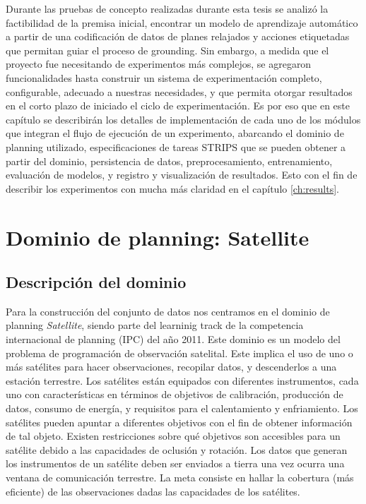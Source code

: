 Durante las pruebas de concepto realizadas durante esta tesis se analizó la factibilidad de la premisa inicial, encontrar un modelo de aprendizaje automático a partir de una codificación de datos de planes relajados y acciones etiquetadas que permitan guiar el proceso de grounding. Sin embargo, a medida que el proyecto fue necesitando de experimentos más complejos, se agregaron funcionalidades hasta construir un sistema de experimentación completo, configurable, adecuado a nuestras necesidades, y que permita otorgar resultados en el corto plazo de iniciado el ciclo de experimentación. Es por eso que en este capítulo se describirán los detalles de implementación de cada uno de los módulos que integran
el flujo de ejecución de un experimento, abarcando el dominio de planning utilizado, especificaciones de tareas STRIPS que se pueden obtener a partir del dominio, persistencia de datos, preprocesamiento, entrenamiento, evaluación de modelos, y registro y visualización de resultados. Esto con el fin de describir los experimentos con mucha más claridad en el capítulo \ref{ch:results}.
\section{Dominio de planning: Satellite}

\subsection{Descripción del dominio}

Para la construcción del conjunto de datos nos centramos en el dominio de planning \emph{Satellite}, siendo parte del learninig track de la competencia internacional de planning (IPC) del año 2011. Este dominio es un modelo del problema de programación de observación satelital. Este implica el uso de uno o más satélites para hacer observaciones, recopilar datos, y descenderlos a una estación terrestre. Los satélites están equipados con diferentes instrumentos, cada uno con características en términos de objetivos de calibración, producción de datos, consumo de energía, y requisitos para el calentamiento y enfriamiento. Los satélites pueden apuntar a diferentes objetivos con el fin de obtener información de tal objeto. Existen restricciones sobre qué objetivos son accesibles para un satélite debido a las capacidades de oclusión y rotación. Los datos que generan los instrumentos de un satélite deben ser enviados a tierra una vez ocurra una ventana de comunicación terrestre. La meta consiste en hallar la cobertura (más eficiente) de las observaciones dadas las capacidades de los satélites.

